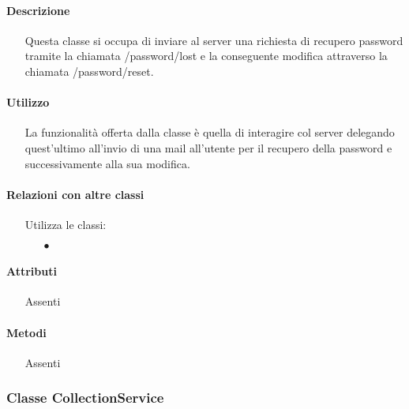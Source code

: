 \paragraph*{Descrizione}
\begin{itemize}
\item[] Questa classe si occupa di inviare al server una richiesta di recupero password tramite la chiamata /password/lost e la conseguente modifica attraverso la chiamata /password/reset.
\end{itemize}

\paragraph*{Utilizzo}
\begin{itemize}
\item[] La  funzionalità offerta dalla classe è quella di interagire col server delegando quest'ultimo all'invio di una mail all'utente per il recupero della password e successivamente alla sua modifica.
\end{itemize}

\paragraph*{Relazioni con altre classi}
\begin{itemize}


\item[] Utilizza le classi:
\begin{itemize}
\item[$\bullet$] 
\end{itemize}
\end{itemize}

\paragraph*{Attributi}
\begin{itemize}
\item[] Assenti
\end{itemize}

\paragraph*{Metodi}
\begin{itemize}
\item[] Assenti
\end{itemize}

\subsubsection{Classe CollectionService}

